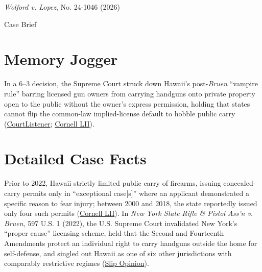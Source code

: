 \documentclass[12pt]{article}
\begin{document}
\begin{center}
{\LARGE \textit{Wolford v. Lopez}, No. 24-1046 (2026)\par}
\vspace{0.8em}
{\large Case Brief\par}
\end{center}
\vspace{1em}

\section{Memory Jogger}
In a 6--3 decision, the Supreme Court struck down Hawaii's post-\textit{Bruen} ``vampire rule'' barring licensed gun owners from carrying handguns onto private property open to the public without the owner's express permission, holding that states cannot flip the common-law implied-license default to hobble public carry (\href{https://www.courtlistener.com/opinion/10880241/wolford-v-lopez/}{CourtListener}; \href{https://www.law.cornell.edu/supremecourt/text/24-1046}{Cornell LII}).

\section{Detailed Case Facts}
Prior to 2022, Hawaii strictly limited public carry of firearms, issuing concealed-carry permits only in ``exceptional case[s]'' where an applicant demonstrated a specific reason to fear injury; between 2000 and 2018, the state reportedly issued only four such permits (\href{https://www.law.cornell.edu/supremecourt/text/24-1046}{Cornell LII}). In \textit{New York State Rifle \& Pistol Ass'n v. Bruen}, 597 U.S. 1 (2022), the U.S. Supreme Court invalidated New York's ``proper cause'' licensing scheme, held that the Second and Fourteenth Amendments protect an individual right to carry handguns outside the home for self-defense, and singled out Hawaii as one of six other jurisdictions with comparably restrictive regimes (\href{https://www.supremecourt.gov/opinions/25pdf/24-1046_nmio.pdf}{Slip Opinion}).
\end{document}

